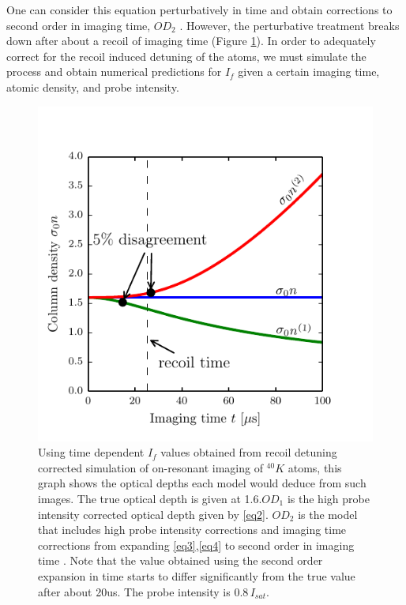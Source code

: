 \documentclass[12pt]{iopart}
\begin{document}
\par One can consider this equation perturbatively in time and obtain corrections to second order in imaging time, $OD_2$  \cite{LJLthesis}. However, the perturbative treatment breaks down after about a recoil of imaging time (Figure \ref{fig:ODcorrections}). In order to adequately correct for the recoil induced detuning of the atoms, we must simulate the process and obtain numerical predictions for $I_f$ given a certain imaging time, atomic density, and probe intensity. 
\begin{figure}
	\includegraphics[scale=0.57]{figure2}
\caption{Using time dependent $I_f$ values obtained from recoil detuning corrected simulation of on-resonant imaging of $^{40}K$ atoms, this graph shows the optical depths each model would deduce from such images. The true optical depth is given at 1.6.$OD_1$ is the high probe intensity corrected optical depth given by \ref{eq2}. $OD_2$ is the model that includes high probe intensity corrections and imaging time corrections from expanding \ref{eq3},\ref{eq4} to second order in imaging time \cite{LJLthesis}. Note that the value obtained using the second order expansion in time starts to differ significantly from the true value after about 20us. The probe intensity is $0.8\, I_{sat}$. }  
\label{fig:ODcorrections}
\end{figure}
\end{document}
